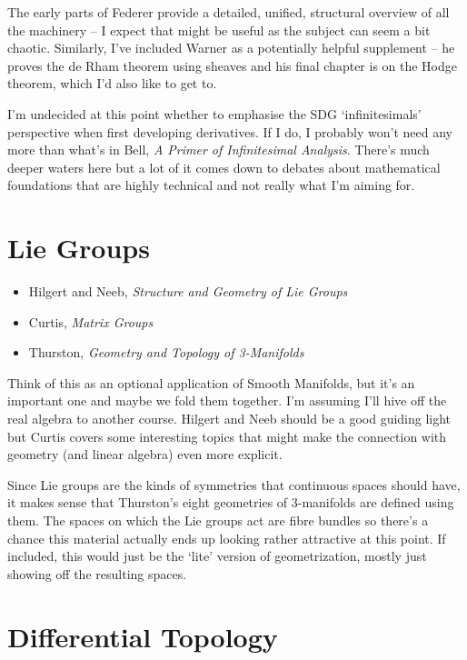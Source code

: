 \documentclass[article]{article}
\begin{document}
The early parts of Federer provide a detailed, unified, structural overview of all the machinery -- I expect that might be useful as the subject can seem a bit chaotic. Similarly, I've included Warner as a potentially helpful supplement -- he proves the de Rham theorem using sheaves and his final chapter is on the Hodge theorem, which I'd also like to get to.

I'm undecided at this point whether to emphasise the SDG `infinitesimals' perspective when first developing derivatives. If I do, I probably won't need any more than what's in Bell, \textit{A Primer of Infinitesimal Analysis}. There's much deeper waters here but a lot of it comes down to debates about mathematical foundations that are highly technical and not really what I'm aiming for.

\section{Lie Groups}

\begin{itemize}
	\item{Hilgert and Neeb, \textit{Structure and Geometry of Lie Groups}}
	\item{Curtis, \textit{Matrix Groups}}
	\item{Thurston, \textit{Geometry and Topology of 3-Manifolds}}
\end{itemize}

Think of this as an optional application of Smooth Manifolds, but it's an important one and maybe we fold them together. I'm assuming I'll hive off the real algebra to another course. Hilgert and Neeb should be a good guiding light but Curtis covers some interesting topics that might make the connection with geometry (and linear algebra) even more explicit. 

Since Lie groups are the kinds of symmetries that continuous spaces should have, it makes sense that Thurston's eight geometries of 3-manifolds are defined using them. The spaces on which the Lie groups act are fibre bundles so there's a chance this material actually ends up looking rather attractive at this point. If included, this would just be the `lite' version of geometrization, mostly just showing off the resulting spaces.

\section{Differential Topology}
\end{document}
